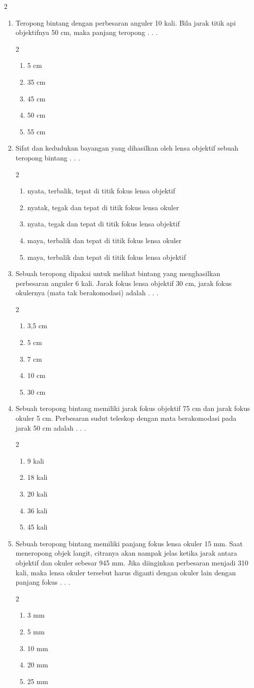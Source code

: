 \documentclass[10pt,a4paper]{extarticle}
\newcommand{\pilgani}[1]{                            \vspace{-0.3cm}\begin{multicols}{2}
 \begin{enumerate}[label=\Alph*., itemsep=0pt,topsep=0pt,leftmargin=*,align=Center]#1                     \end{enumerate}
 \phantom{ini cuma sapi, wedus, dan ayam}
 \end{multicols}}
\begin{document}
\begin{multicols*}{2}
\begin{enumerate}
\item Teropong bintang dengan perbesaran anguler 10 kali. Bila jarak titik api objektifnya 50 cm, maka panjang teropong . . . 
\pilgani{
	\item 5 cm
	\item 35 cm
	\item 45 cm
	\item 50 cm
	\item 55 cm }
\vspace{3cm}

\item Sifat dan kedudukan bayangan yang dihasilkan oleh lensa objektif sebuah teropong bintang . . .
\pilgani{
	\item nyata, terbalik, tepat di titik fokus lensa objektif
	\item nyatak, tegak dan tepat di titik fokus lensa okuler
	\item nyata, tegak dan tepat di titik fokus lensa objektif
	\item maya, terbalik dan tepat di titik fokus lensa okuler
	\item maya, terbalik dan tepat di titik fokus lensa objektif
}
\vspace{2cm}

\item Sebuah teropong dipakai untuk melihat bintang yang menghasilkan perbesaran anguler 6 kali. Jarak fokus lensa objektif 30 cm, jarak fokus okulernya (mata tak berakomodasi) adalah . . .
\pilgani{
	\item 3,5 cm
	\item 5 cm
	\item 7 cm
	\item 10 cm
	\item 30 cm }
\vspace{3cm}

\item Sebuah teropong bintang memiliki jarak fokus objektif 75 cm dan jarak fokus okuler 5 cm. Perbesaran sudut teleskop dengan mata berakomodasi pada jarak 50 cm adalah . . .
\pilgani{
	\item 9 kali
	\item 18 kali
	\item 20 kali
	\item 36 kali
	\item 45 kali }

\item Sebuah teropong bintang memiliki panjang fokus lensa okuler 15 mm. Saat meneropong objek langit, citranya akan nampak jelas ketika jarak antara objektif dan okuler sebesar 945 mm. Jika diinginkan perbesaran menjadi 310 kali, maka lensa okuler tersebut harus diganti dengan okuler lain dengan panjang fokus . . . 
\pilgani{
	\item 3 mm
	\item 5 mm
	\item 10 mm
	\item 20 mm
	\item 25 mm
}
\vspace{3cm}



\end{enumerate}
\end{multicols*}
\end{document}
